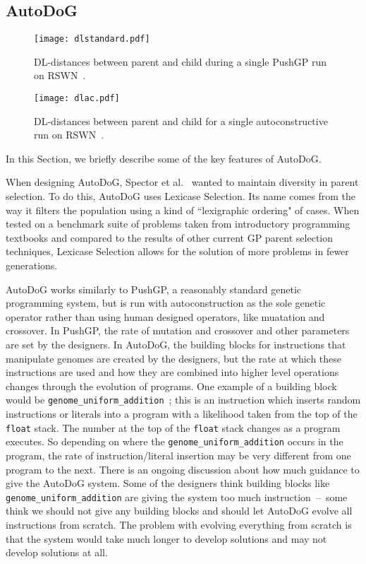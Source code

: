 \documentclass{sig-alternate}
\begin{document}
\subsection{AutoDoG}
\label{sec:autodog}

\begin{figure*}
	\centering
	\begin{minipage}[b]{0.4\textwidth}
		\texttt{[image: dlstandard.pdf]}
		\caption{DL-distances between parent and child during a single PushGP run on RSWN~\cite{spector:2016}.}
		\label{fig:standard}
	\end{minipage}
	\hfill
	\begin{minipage}[b]{0.4\textwidth}
		\texttt{[image: dlac.pdf]}
		\caption{DL-distances between parent and child for a single autoconstructive run on RSWN~\cite{spector:2016}.}
		\label{fig:ac}
	\end{minipage}
\end{figure*}

In this Section, we briefly describe some of the key features of AutoDoG.

When designing AutoDoG, Spector et al.~\cite{spector:2016} wanted to maintain diversity in parent selection. To do this, AutoDoG uses Lexicase Selection. Its name comes from the way it filters the population using a kind of ``lexigraphic ordering" of cases. When tested on a benchmark suite of problems taken from introductory programming textbooks and compared to the results of other current GP parent selection techniques, Lexicase Selection allows for the solution of more problems in fewer generations.

AutoDoG works similarly to PushGP, a reasonably standard genetic programming system, but is run with autoconstruction as the sole genetic operator rather than using human designed operators, like muatation and crossover. In PushGP, the rate of mutation and crossover and other parameters are set by the designers. In AutoDoG, the building blocks for instructions that manipulate genomes are created by the designers, but the rate at which these instructions are used and how they are combined into higher level operations changes through the evolution of programs. One example of a building block would be  \texttt{genome\_uniform\_addition}~\cite{clojush}; this is an instruction which inserts random instructions or literals into a program with a likelihood taken from the top of the \texttt{float} stack. The number at the top of the \texttt{float} stack changes as a program executes. So depending on where the \texttt{genome\_uniform\_addition} occurs in the program, the rate of instruction/literal insertion may be very different from one program to the next. There is an ongoing discussion about how much guidance to give the AutoDoG system. Some of the designers think building blocks like \texttt{genome\_uniform\_addition} are giving the system too much instruction~--~some think we should not give any building blocks and should let AutoDoG evolve all instructions from scratch. The problem with evolving everything from scratch is that the system would take much longer to develop solutions and may not develop solutions at all.
\end{document}
